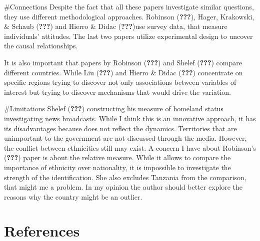 \documentclass[
  english,
  man]{apa6}
\begin{document}
\#Connections
Despite the fact that all these papers investigate similar questions, they use different methodological approaches. Robinson ({\textbf{???}}), Hager, Krakowski, \& Schaub ({\textbf{???}}) and Hierro \& Didac ({\textbf{???}})use survey data, that measure individuals' attitudes. The last two papers utilize experimental design to uncover the causal relationships.

It is also important that papers by Robinson ({\textbf{???}}) and Shelef ({\textbf{???}}) compare different countries. While Liu ({\textbf{???}}) and Hierro \& Didac ({\textbf{???}}) concentrate on specific regions trying to discover not only associations between variables of interest but trying to discover mechanisms that would drive the variation.

\#Limitations
Shelef ({\textbf{???}}) constructing his measure of homeland status investigating news broadcasts. While I think this is an innovative approach, it has its disadvantages because does not reflect the dynamics. Territories that are unimportant to the government are not discussed through the media. However, the conflict between ethnicities still may exist. A concern I have about Robinson's ({\textbf{???}}) paper is about the relative measure. While it allows to compare the importance of ethnicity over nationality, it is impossible to investigate the strength of the identification. She also excludes Tanzania from the comparison, that might me a problem. In my opinion the author should better explore the reasons why the country might be an outlier.

\newpage

\hypertarget{references}{%
\section{References}\label{references}}

\begingroup
\setlength{\parindent}{-0.5in}
\setlength{\leftskip}{0.5in}

\hypertarget{refs}{}

\endgroup
\end{document}
